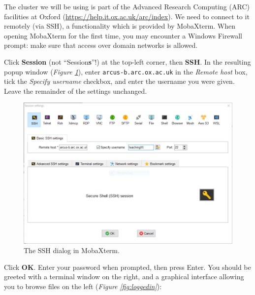 \documentclass[10pt]{article}
\newcommand{\figref}[1]{\textit{Figure \ref{fig:#1}}}
\begin{document}
The cluster we will be using is part of the Advanced Research Computing (ARC) facilities at Oxford (\url{https://help.it.ox.ac.uk/arc/index}). We need to connect to it remotely (via SSH), a functionality which is provided by MobaXterm. When opening MobaXterm for the first time, you may encounter a Windows Firewall prompt: make sure that access over domain networks is allowed.

Click \textbf{Session} (not ``Session\textbf{s}''!) at the top-left corner, then \textbf{SSH}.  In the resulting popup window (\figref{ssh}), enter \texttt{arcus-b.arc.ox.ac.uk} in the \textit{Remote host} box, tick the \textit{Specify username} checkbox, and enter the username you were given. Leave the remainder of the settings unchanged.

\begin{figure}[H]
    \centering
    \includegraphics[scale=0.5]{./img/ssh}
    \caption{The SSH dialog in MobaXterm.}
    \label{fig:ssh}
\end{figure}

Click \textbf{OK}. Enter your password when prompted, then press Enter. You should be greeted with a terminal window on the right, and a graphical interface allowing you to browse files on the left (\figref{loggedin}):
\end{document}

